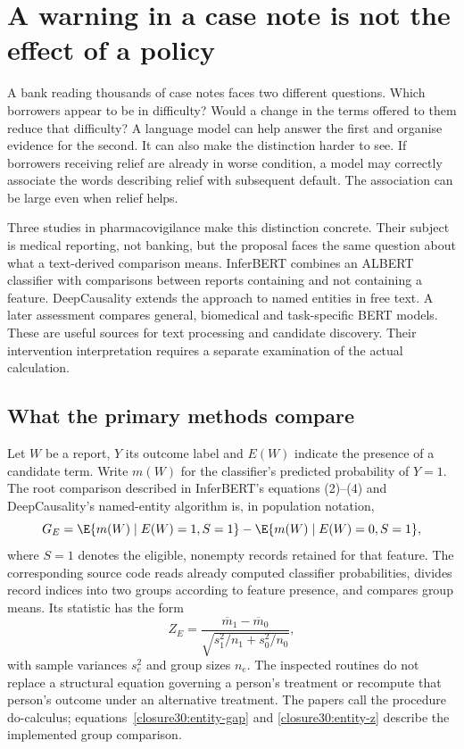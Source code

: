 \chapter{A warning in a case note is not the effect of a policy}
\label{closure30:text-signals}

A bank reading thousands of case notes faces two different questions. Which
borrowers appear to be in difficulty? Would a change in the terms offered to
them reduce that difficulty? A language model can help answer the first and
organise evidence for the second. It can also make the distinction harder to
see. If borrowers receiving relief are already in worse condition, a model
may correctly associate the words describing relief with subsequent default.
The association can be large even when relief helps.

Three studies in pharmacovigilance make this distinction concrete. Their
subject is medical reporting, not banking, but the proposal faces the same
question about what a text-derived comparison means. InferBERT combines an
ALBERT classifier with comparisons between reports containing and not
containing a feature. DeepCausality extends the approach to named entities
in free text. A later assessment compares general, biomedical and
task-specific BERT models. These are useful sources for text processing and
candidate discovery. Their intervention interpretation requires a separate
examination of the actual calculation.
\citep{closure30inferbert,closure30deepcausality,closure30pharma}

\section{What the primary methods compare}

Let $W$ be a report, $Y$ its outcome label and $E(W)$ indicate the presence of
a candidate term. Write $m(W)$ for the classifier's predicted probability of
$Y=1$. The root comparison described in InferBERT's equations (2)--(4) and
DeepCausality's named-entity algorithm is, in population notation,
\begin{equation}
 G_E=\E\{m(W)\mid E(W)=1,S=1\}
       -\E\{m(W)\mid E(W)=0,S=1\},
 \label{closure30:entity-gap}
\end{equation}
where $S=1$ denotes the eligible, nonempty records retained for that feature.
The corresponding source code reads already computed classifier
probabilities, divides record indices into two groups according to feature
presence, and compares group means. Its statistic has the form
\begin{equation}
 Z_E=\frac{\overline m_1-\overline m_0}
 {\sqrt{s_1^2/n_1+s_0^2/n_0}},
 \label{closure30:entity-z}
\end{equation}
with sample variances $s_e^2$ and group sizes $n_e$. The inspected routines
do not replace a structural equation governing a person's treatment or
recompute that person's outcome under an alternative treatment. The papers
call the procedure do-calculus; equations~\eqref{closure30:entity-gap} and
\eqref{closure30:entity-z} describe the implemented group comparison.
\citep[pp.~5--6, equations (2)--(6)]{closure30inferbert}
\citep[pp.~4--6, Algorithm 1]{closure30deepcausality}
\citep{closure30inferbertcode,closure30deepcausalitycode}

